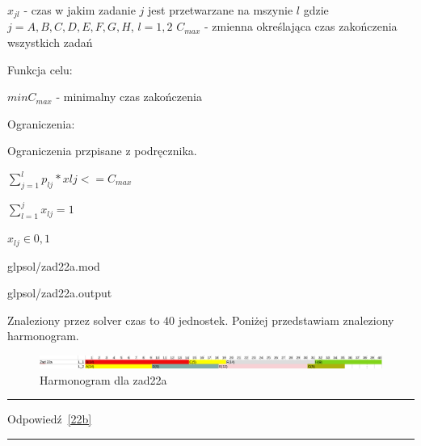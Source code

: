 \documentclass{article}
\begin{document}
$x_{jl}$ - czas w jakim zadanie $j$ jest przetwarzane na mszynie $l$ gdzie $j = {A,B,C,D,E,F,G,H}$, $l = {1,2}$ 
$C_{max}$ - zmienna określająca czas zakończenia wszystkich zadań

\noindent Funkcja celu:

$min C_{max}$ - minimalny czas zakończenia

\noindent Ograniczenia:

Ograniczenia przpisane z podręcznika.

$\sum^{l}_{j = 1} p_{lj}*x{lj} <= C_{max}$

$\sum^{j}_{l = 1} x_{lj} = 1$

$x_{lj} \in {0,1}$


{glpsol/zad22a.mod}


{glpsol/zad22a.output}

Znaleziony przez solver czas to $40$ jednostek. Poniżej przedstawiam znaleziony harmonogram.

\begin{figure}[h]    
  \centering    
  \includegraphics[width=\linewidth]{others/zad22a_harmonogram.png}
  \caption{Harmonogram dla zad22a}
\end{figure}

\par\noindent\rule{\textwidth}{0.4pt}
Odpowiedź \ref{22b}
\par\noindent\rule{\textwidth}{0.4pt}



\printbibliography
\end{document}
